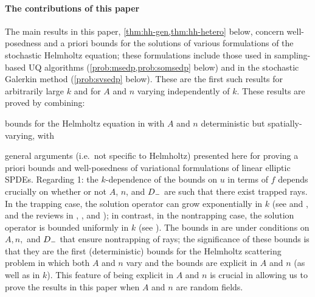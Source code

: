 \paragraph{The contributions of this paper} The main results in this paper, \cref{thm:hh-gen,thm:hh-hetero} below, concern well-posedness and a priori bounds for the solutions of various formulations of the stochastic Helmholtz equation; these formulations include those used in sampling-based UQ algorithms (\cref{prob:msedp,prob:somsedp} below) and in the stochastic Galerkin method (\cref{prob:svsedp} below). These are the first such results for arbitrarily large $k$ and for $A$ and $n$ varying independently of $k$. These results are proved by combining:
\ben
\item bounds for the Helmholtz equation in \cite{GrPeSp:19} with $A$ and $n$ deterministic but spatially-varying, with
\item general arguments (i.e.~not specific to Helmholtz) presented here for proving a priori bounds and well-posedness of variational formulations of linear elliptic SPDEs.
\een
Regarding 1: the $k$-dependence of the bounds on $u$ in terms of $f$ depends crucially on whether or not $A$, $n$, and $D_{-}$ are such that there exist trapped rays. In the trapping case, the solution operator can grow exponentially in $k$ (see \cite{Ra:71,Bu:98,PoVo:99a,CaPo:02,Be:03} and \cite[Section 2.5]{BeChGrLaLi:11}, and the reviews in \cite[Section 6]{MoSp:19}, \cite[Section 1.1]{ChSpGiSm:17}, and \cite[Section 1]{GrPeSp:19}); in contrast, in the nontrapping case, the solution operator is bounded uniformly in $k$ (see \cite{Va:75,MeSj:78,Bu:02}). The bounds in \cite{GrPeSp:19} are under conditions on $A,n,$ and $D_{-}$ that ensure nontrapping of rays; the significance of these bounds is that they are the first (deterministic) bounds for the Helmholtz scattering problem in which both $A$ and $n$ vary and the bounds are explicit in $A$ and $n$ (as well as in $k$). This feature of being explicit in $A$ and $n$ is crucial in allowing us to prove the results in this paper when $A$ and $n$ are random fields.

